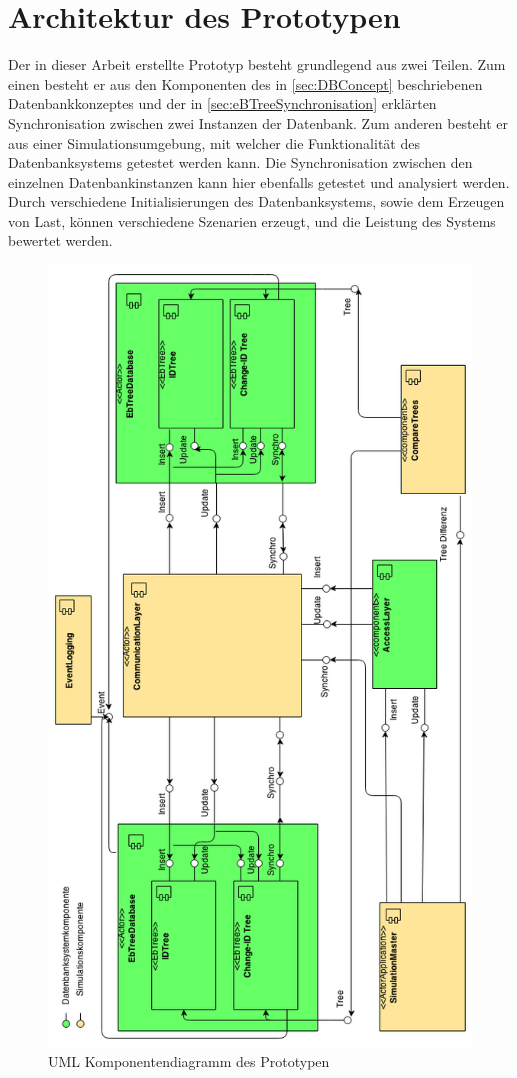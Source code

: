 \documentclass[a4paper,11pt,oneside,%
headsepline,												%
footsepline,												%
bibtotocnumbered									%
]{scrreprt}
\begin{document}
\section{Architektur des Prototypen}

Der in dieser Arbeit erstellte Prototyp besteht grundlegend aus zwei Teilen. Zum einen besteht er aus den Komponenten des in \autoref{sec:DBConcept} beschriebenen Datenbankkonzeptes und der in \autoref{sec:eBTreeSynchronisation} erklärten Synchronisation zwischen zwei Instanzen der Datenbank. Zum anderen besteht er aus einer Simulationsumgebung, mit welcher die Funktionalität des Datenbanksystems getestet werden kann. Die Synchronisation zwischen den einzelnen Datenbankinstanzen kann hier ebenfalls getestet und analysiert werden. Durch verschiedene Initialisierungen des Datenbanksystems, sowie dem Erzeugen von Last, können verschiedene Szenarien erzeugt, und die Leistung des Systems bewertet werden. \\
\newpage
\begin{figure}[h!]
  \begin{center}
    \includegraphics[width=0.75\linewidth]{bilder/prototyp_component_diagram.png}
  \end{center}
 \caption{UML Komponentendiagramm des Prototypen}
\end{figure}
\end{document}
